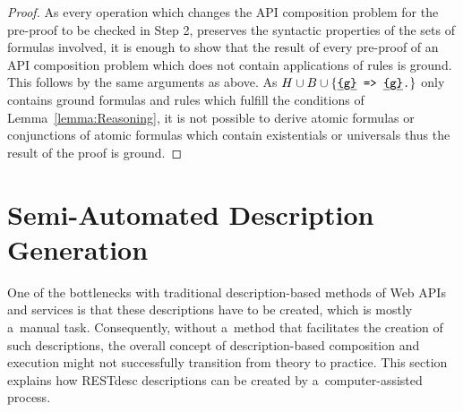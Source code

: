 \begin{proof}
As every operation which changes the API composition problem for the pre-proof to be checked in Step 2, preserves the syntactic properties of the 
sets of formulas involved, it is enough to show that the result of every pre-proof of an API composition problem which does not contain 
applications of \restdesc rules is ground. %
This follows by the same arguments as above. As $H\cup B \cup \{ \texttt{\underline{\{}g\underline{\}} => \underline{\{}g\underline{\}}.}\}$ 
only contains ground formulas and rules which fulfill
the conditions of Lemma~\ref{lemma:Reasoning},
it is not possible to derive atomic formulas or conjunctions of atomic formulas which contain existentials or universals %
thus the result of the proof is ground.
% 
% 
% 
% 
\end{proof}

\section{Semi-Automated Description Generation}
\label{sec:Generation}
One of the bottlenecks with traditional description-based methods of Web APIs and services
is that these descriptions have to be created, which is mostly a~manual task.
Consequently, without a~method that facilitates the creation of such descriptions,
the overall concept of description-based composition and execution
might not successfully transition from theory to practice.
This section explains how RESTdesc descriptions can be created
by a~computer-assisted process.

